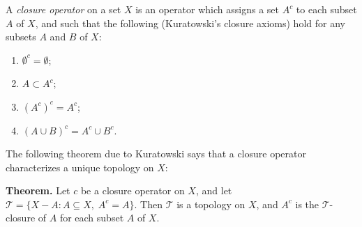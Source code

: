 \documentclass[12pt]{article}
\begin{document}
A \emph{closure operator} on a set $X$ is an operator which assigns a set $A^c$ to each subset $A$ of $X$, and such that the following (Kuratowski's closure axioms) hold for any subsets $A$ and $B$ of $X$:
\begin{enumerate}
\item $\emptyset^c = \emptyset$;
\item $A\subset A^c$;
\item $(A^c)^c = A^c$;
\item $(A\cup B)^c = A^c\cup B^c.$
\end{enumerate}

The following theorem due to Kuratowski says that a closure operator characterizes a unique topology on $X$:

\textbf{Theorem.} Let $c$ be a closure operator on $X$, and let $\mathcal{T} = \{X-A: A\subseteq X,\; A^c=A\}$. Then $\mathcal{T}$ is a topology on $X$, and $A^c$ is the $\mathcal{T}$-closure of $A$ for each subset $A$ of $X$.
\end{document}
